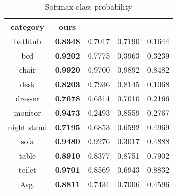 \documentclass[10pt,twocolumn,letterpaper]{article}
\begin{document}
\begin{table}[h]
\caption{Softmax class probability}\label{synthesisSingleExp}
\vspace{-2mm}
\centering
\begin{small}
\begin{tabular}{|c|c|c|c|c|}
\hline
category & ours   & \cite{3dgan}   & \cite{kingma2013auto}  &  \cite{wu20153d}  \\ \hline \hline

bathtub    & \textbf{0.8348} & 0.7017 & 0.7190 & 0.1644 \\ \hline

bed     & \textbf{0.9202} & 0.7775 & 0.3963 & 0.3239 \\ \hline

chair   & \textbf{0.9920} & 0.9700  & 0.9892 & 0.8482 \\ \hline

desk      & \textbf{0.8203} & 0.7936 & 0.8145 & 0.1068  \\ \hline

dresser      & \textbf{0.7678} & 0.6314 & 0.7010 & 0.2166  \\ \hline

monitor & \textbf{0.9473} & 0.2493   & 0.8559 & 0.2767\\ \hline

night stand    & \textbf{0.7195} & 0.6853 & 0.6592 & 0.4969\\ \hline

sofa   & \textbf{0.9480} &  0.9276  & 0.3017 & 0.4888\\ \hline  

table    & \textbf{0.8910} & 0.8377 & 0.8751 &0.7902 \\ \hline
toilet   & \textbf{0.9701} &  0.8569  & 0.6943 & 0.8832\\ \hline \hline

Avg.   & \textbf{0.8811} &  0.7431   & 0.7006 & 0.4596\\ \hline 

\end{tabular}
\end{small}
\end{table}
\vspace{-2mm}
\end{document}

